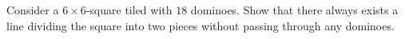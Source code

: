 Consider a $6 \times 6$-square tiled with $18$ dominoes. Show that there always exists a line
dividing the square into two pieces without passing through any dominoes.